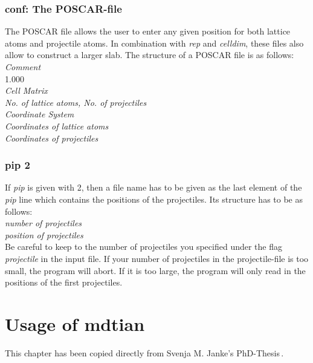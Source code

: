 \documentclass[twoside, 11pt, titlepage, captions=nooneline, a4paper, headsepline]{scrbook}%
\begin{document}
\subsection{conf: The POSCAR-file}
The POSCAR file allows the user to enter any given position for both lattice atoms and projectile atoms. In combination with \emph{rep} and \emph{celldim}, these files also allow to construct a larger slab.
The structure of a POSCAR file is as follows:\\
\emph{Comment}\\
1.000\\
\emph{Cell Matrix}\\
\emph{No. of lattice atoms, No. of projectiles}\\
\emph{Coordinate System}\\
\emph{Coordinates of lattice atoms}\\
\emph{Coordinates of projectiles}
\subsection{pip 2}
If \emph{pip} is given with 2, then a file name has to be given as the last element of the \emph{pip} line which contains the positions of the projectiles. Its structure has to be as follows:\\
\emph{number of projectiles}\\
\emph{position of projectiles}\\
Be careful to keep to the number of projectiles you specified under the flag \emph{projectile} in the input file. If your number of projectiles in the projectile-file is too small, the program will abort. If it is too large, the program will only read in the positions of the first projectiles.\\

\chapter{Usage of mdtian}
\label{Sec:usage:MDtian}
This chapter has been copied directly from Svenja M. Janke's PhD-Thesis\,\cite{svenjaphd}.
\end{document}
